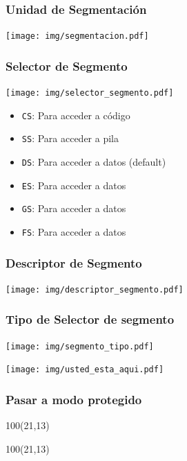 \documentclass[aspectratio=169]{beamer}
\begin{document}
\begin{frame}
    \frametitle{Unidad de Segmentación}
    \begin{center}
    \texttt{[image: img/segmentacion.pdf]}
    \end{center}
\end{frame}

\begin{frame}
    \frametitle{Selector de Segmento}
    \begin{center}
    \texttt{[image: img/selector\_segmento.pdf]}
    \end{center}
    \begin{itemize}
        \setlength\itemsep{0.2em}
        \item[] \texttt{CS}: Para acceder a código
        \item[] \texttt{SS}: Para acceder a pila
        \item[] \texttt{DS}: Para acceder a datos (default)
        \item[] \texttt{ES}: Para acceder a datos
        \item[] \texttt{GS}: Para acceder a datos
        \item[] \texttt{FS}: Para acceder a datos
    \end{itemize}
\end{frame}

\begin{frame}
    \frametitle{Descriptor de Segmento}
    \begin{center}
    \texttt{[image: img/descriptor\_segmento.pdf]}
    \end{center}
\end{frame}

\begin{frame}
    \frametitle{Tipo de Selector de segmento}
    \begin{center}
    \texttt{[image: img/segmento\_tipo.pdf]}
    \end{center}
\end{frame}

\begin{frame}[plain]
    \begin{center}
    \texttt{[image: img/usted\_esta\_aqui.pdf]}
    \end{center}
\end{frame}

\begin{frame}
    \frametitle{Pasar a modo protegido}
    \begin{textblock}{100}(21,13)
    \end{textblock}
    \begin{textblock}{100}(21,13)
    \end{textblock}
\end{frame}
\end{document}
